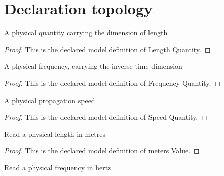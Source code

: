 \section{Declaration topology}
\begin{definition}
  \label{def:physics:phyx-mini-0169:phyxminiproblems-problemphyxmini0169-lengthquantity}
  A physical quantity carrying the dimension of length
\end{definition}
\begin{proof}
  This is the declared model definition of Length Quantity.
\end{proof}
\begin{definition}
  \label{def:physics:phyx-mini-0169:phyxminiproblems-problemphyxmini0169-frequencyquantity}
  A physical frequency, carrying the inverse-time dimension
\end{definition}
\begin{proof}
  This is the declared model definition of Frequency Quantity.
\end{proof}
\begin{definition}
  \label{def:physics:phyx-mini-0169:phyxminiproblems-problemphyxmini0169-speedquantity}
  A physical propagation speed
\end{definition}
\begin{proof}
  This is the declared model definition of Speed Quantity.
\end{proof}
\begin{definition}
  \label{def:physics:phyx-mini-0169:phyxminiproblems-problemphyxmini0169-metersvalue}
  Read a physical length in metres
\end{definition}
\begin{proof}
  This is the declared model definition of meters Value.
\end{proof}
\begin{definition}
  \label{def:physics:phyx-mini-0169:phyxminiproblems-problemphyxmini0169-hertzvalue}
  Read a physical frequency in hertz
\end{definition}

